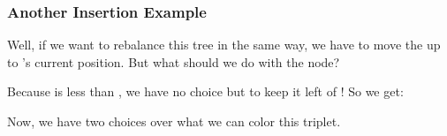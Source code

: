 \documentclass[aspectratio=169]{beamer}
\begin{document}
\begin{frame}
  \frametitle{Another Insertion Example}

  \begin{center}
  \begin{minipage}{0.6\textwidth}
    \raggedright

    Well, if we want to rebalance this tree in the same way, we have to
    move the  up to 's current position. But what should we
    do with the  node?

    \pause
    \vspace{10pt}

    Because  is less than , we have no choice but to keep it
    left of ! So we get:

    \pause
    \vspace{10pt}

    Now, we have two choices over what we can color this triplet.

  \end{minipage}
  \hfill
  \begin{minipage}{0.37\textwidth}
    \centering
  \end{minipage}
  \end{center}
\end{frame}
\end{document}
